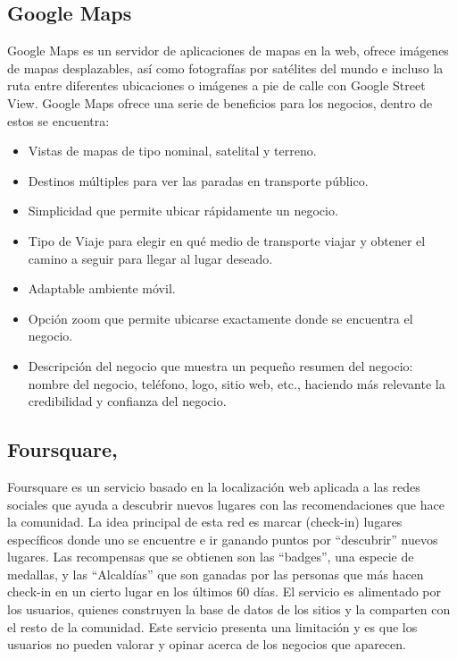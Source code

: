 \documentclass[12pt,letterpaper,openany]{book}
\begin{document}
\subsection{Google Maps\cite{23}}
Google Maps es un servidor de aplicaciones de mapas en la web, ofrece imágenes de mapas desplazables, así como fotografías por satélites del mundo e incluso la ruta entre diferentes ubicaciones o imágenes a pie de calle con Google Street View.
Google Maps ofrece una serie de beneficios para los negocios, dentro de estos se encuentra: 
\begin{itemize}
    \item Vistas de mapas de tipo nominal, satelital y terreno.
    \item Destinos múltiples para ver las paradas en transporte público.
    \item Simplicidad que permite ubicar rápidamente un negocio.
    \item Tipo de Viaje para elegir en qué medio de transporte viajar y obtener el camino a seguir para llegar al lugar deseado.
    \item Adaptable ambiente móvil.
    \item Opción zoom que permite ubicarse exactamente donde se encuentra el negocio.
    \item Descripción del negocio que muestra un pequeño resumen del negocio: nombre del negocio, teléfono, logo, sitio web, etc., haciendo más relevante la credibilidad y confianza del negocio.
\end{itemize}

\subsection{Foursquare\cite{24}, \cite{25}}
Foursquare es un servicio basado en la localización web aplicada a las redes sociales que ayuda a descubrir nuevos lugares con las recomendaciones que hace la comunidad.
La idea principal de esta red es marcar (check-in) lugares específicos donde uno se encuentre e ir ganando puntos por “descubrir” nuevos lugares.
Las recompensas que se obtienen son las “badges”, una especie de medallas, y las “Alcaldías” que son ganadas por las personas que más hacen check-in en un cierto lugar en los últimos 60 días.
El servicio es alimentado por los usuarios, quienes construyen la base de datos de los sitios y la comparten con el resto de la comunidad. Este servicio presenta una limitación y es que los usuarios no pueden valorar y opinar acerca de los negocios que aparecen.
\end{document}
